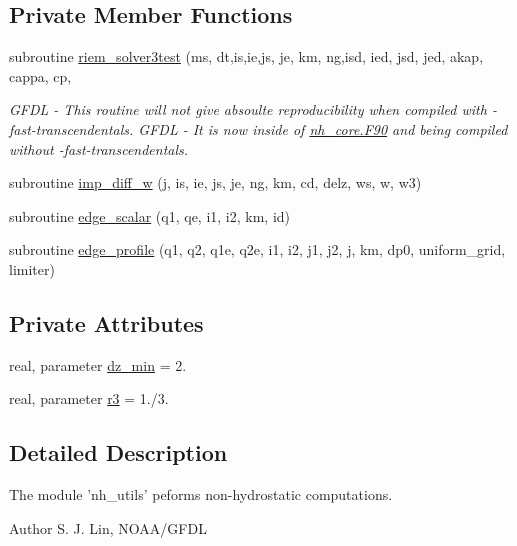 \subsection*{Private Member Functions}
\begin{DoxyCompactItemize}
\item 
subroutine \hyperlink{classnh__utils__mod_a450b7ba2e55fb51928e3f7d61cab3fc7}{riem\-\_\-solver3test} (ms, dt,is,ie,js, je, km, ng,isd, ied, jsd, jed, akap, cappa, cp,
\begin{DoxyCompactList}\small\item\em G\-F\-D\-L -\/ This routine will not give absoulte reproducibility when compiled with -\/fast-\/transcendentals. G\-F\-D\-L -\/ It is now inside of \hyperlink{nh__core_8F90}{nh\-\_\-core.\-F90} and being compiled without -\/fast-\/transcendentals. \end{DoxyCompactList}\item 
subroutine \hyperlink{classnh__utils__mod_a20b7c4de8f64dacc17df9c0e4ac676aa}{imp\-\_\-diff\-\_\-w} (j, is, ie, js, je, ng, km, cd, delz, ws, w, w3)
\item 
subroutine \hyperlink{classnh__utils__mod_a4a0e44a9960d4023dca79a4332954cd2}{edge\-\_\-scalar} (q1, qe, i1, i2, km, id)
\item 
subroutine \hyperlink{classnh__utils__mod_a9a06dba3de6db5cdd862b36dc5553b9e}{edge\-\_\-profile} (q1, q2, q1e, q2e, i1, i2, j1, j2, j, km, dp0, uniform\-\_\-grid, limiter)
\end{DoxyCompactItemize}
\subsection*{Private Attributes}
\begin{DoxyCompactItemize}
\item 
real, parameter \hyperlink{classnh__utils__mod_a29df8f0c8a425db2e38a865d131ae9bb}{dz\-\_\-min} = 2.
\item 
real, parameter \hyperlink{classnh__utils__mod_a11855ede9ba4e45e0e95746e9aa50699}{r3} = 1./3.
\end{DoxyCompactItemize}


\subsection{Detailed Description}
The module 'nh\-\_\-utils' peforms non-\/hydrostatic computations. 

\begin{DoxyAuthor}{Author}
S. J. Lin, N\-O\-A\-A/\-G\-F\-D\-L 
\end{DoxyAuthor}



